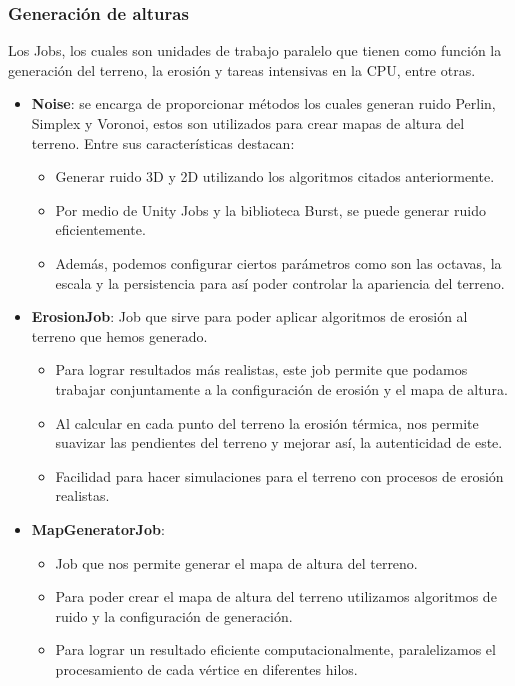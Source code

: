 \subsubsection{Generación de alturas}
Los Jobs, los cuales son unidades de trabajo paralelo que tienen como función la generación del terreno, la erosión y tareas intensivas en la CPU, entre otras.
\begin{itemize}
    
    \item \textbf{Noise}: se encarga de proporcionar métodos los cuales generan ruido Perlin, Simplex y Voronoi, estos son utilizados para crear mapas de altura del terreno. Entre sus características destacan:
			
    \begin{itemize}
        \item Generar ruido 3D y 2D utilizando los algoritmos citados anteriormente.
	\item Por medio de Unity Jobs y la biblioteca Burst, se puede generar ruido eficientemente.	
        \item Además, podemos configurar ciertos parámetros como son las octavas, la escala y la persistencia para así poder controlar la apariencia del terreno.
        
    \end{itemize}

    \item \textbf{ErosionJob}: Job que sirve para poder aplicar algoritmos de erosión al terreno que hemos generado.
    \begin{itemize}
        \item Para lograr resultados más realistas, este job permite que podamos trabajar conjuntamente a la configuración de erosión y el mapa de altura.
	\item Al calcular en cada punto del terreno la erosión térmica, nos permite suavizar las pendientes del terreno y mejorar así, la autenticidad de este.
        \item Facilidad para hacer simulaciones para el terreno con procesos de erosión realistas. 
    \end{itemize}

    \item \textbf{MapGeneratorJob}: 
    \begin{itemize}
        \item Job que nos permite generar el mapa de altura del terreno.
        \item Para poder crear el mapa de altura del terreno utilizamos algoritmos de ruido y la configuración de generación. 
        \item Para lograr un resultado eficiente computacionalmente, paralelizamos el procesamiento de cada vértice en diferentes hilos.
    \end{itemize}
    
\end{itemize}

